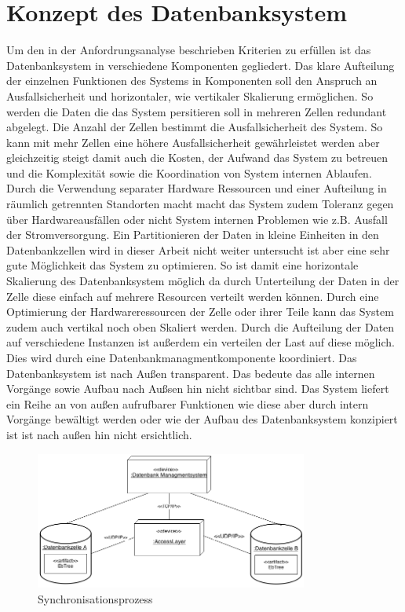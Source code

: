 \documentclass[a4paper,11pt,oneside,%
headsepline,												%
footsepline,												%
bibtotocnumbered									%
]{scrreprt}
\begin{document}
\section{Konzept des Datenbanksystem}
\label{sec:DBSystemConcept} 
Um den in der Anfordrungsanalyse beschrieben Kriterien zu erfüllen ist das Datenbanksystem  in verschiedene Komponenten gegliedert. Das klare Aufteilung der einzelnen Funktionen des Systems in Komponenten soll den Anspruch an Ausfallsicherheit und horizontaler, wie vertikaler Skalierung ermöglichen. So werden die Daten die das System persitieren soll in mehreren Zellen redundant abgelegt. Die Anzahl der Zellen bestimmt die Ausfallsicherheit des System. So kann mit mehr Zellen eine höhere Ausfallsicherheit gewährleistet werden aber gleichzeitig steigt damit auch die Kosten, der Aufwand das System zu betreuen und die Komplexität sowie die Koordination von System internen Ablaufen. Durch die Verwendung separater Hardware Ressourcen und einer Aufteilung in räumlich getrennten Standorten macht macht das System zudem Toleranz gegen über Hardwareausfällen oder nicht System internen Problemen wie z.B. Ausfall der Stromversorgung. Ein Partitionieren der Daten in kleine Einheiten in den Datenbankzellen wird in dieser Arbeit nicht weiter untersucht ist aber eine sehr gute Möglichkeit das System zu optimieren. So ist damit eine horizontale Skalierung des Datenbanksystem möglich da durch Unterteilung der Daten in der Zelle diese einfach auf mehrere Resourcen verteilt werden können. Durch eine Optimierung der Hardwareressourcen der Zelle oder ihrer Teile kann das System zudem auch vertikal noch oben Skaliert werden. Durch die Aufteilung der Daten auf verschiedene Instanzen ist außerdem  ein verteilen der Last auf diese möglich. Dies wird durch eine Datenbankmanagmentkomponente koordiniert. Das Datenbanksystem ist nach Außen transparent. Das bedeute das alle internen Vorgänge sowie Aufbau nach Außsen hin nicht sichtbar sind. Das System liefert ein Reihe an von außen aufrufbarer Funktionen wie diese aber durch intern Vorgänge bewältigt werden oder wie der Aufbau des Datenbanksystem konzipiert ist ist nach außen hin nicht ersichtlich.
\begin{figure}[h!]
 	\centering
    \includegraphics[width=0.8\textwidth]{bilder/uml_deployment_dia.png}
    \caption{Synchronisationsprozess}
\end{figure}
\end{document}
